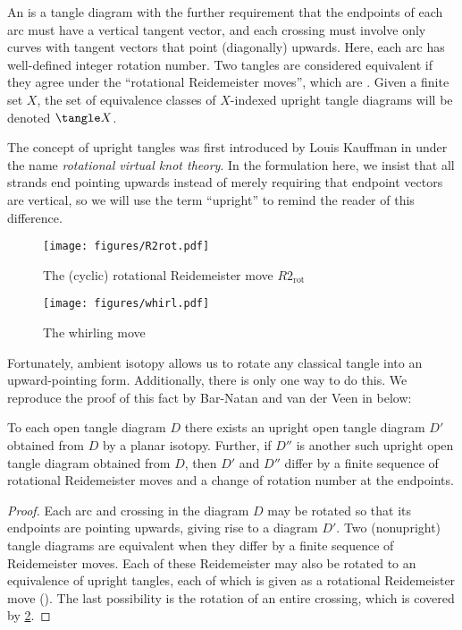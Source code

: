 \begin{definition}
        An  is a tangle diagram with the further
        requirement that the endpoints of each arc must have a vertical tangent
        vector, and each crossing must involve only curves with tangent vectors
        that point (diagonally) upwards. Here, each arc has well-defined integer
        rotation number. Two tangles are considered equivalent if they agree
        under the \enquote{rotational Reidemeister moves}, which are
        . Given a finite set $X$, the set of
        equivalence classes of $X$-indexed upright tangle diagrams will be
        denoted $\tangle X$.
\end{definition}
\begin{remark}
        The concept of upright tangles was first introduced by Louis Kauffman in
        \cite{LK} under the name \emph{rotational virtual knot theory}. In the
        formulation here, we insist that all strands end pointing upwards
        instead of merely requiring that endpoint vectors are vertical, so we
        will use the term \enquote{upright} to remind the reader of this
        difference.
\end{remark}
\begin{figure}[h]
        \centering
        \texttt{[image: figures/R2rot.pdf]}
        \caption{The (cyclic) rotational Reidemeister move $R2_{\text{rot}}$}
        \label{fig:R2rot}
\end{figure}
\begin{figure}[h]
        \centering
        \texttt{[image: figures/whirl.pdf]}
        \caption{The whirling move}
        \label{fig:whirl}
\end{figure}

Fortunately, ambient isotopy allows us to rotate any classical tangle into an
upward-pointing form. Additionally, there is only one way to do this. We
reproduce the proof of this fact by Bar-Natan and van der Veen in \cite{BV}
below:

\begin{lemma}
        To each open tangle diagram $D$ there exists an upright open tangle
        diagram $D'$ obtained from $D$ by a planar isotopy. Further, if $D''$ is
        another such upright open tangle diagram obtained from $D$, then $D'$
        and $D''$ differ by a finite sequence of rotational Reidemeister moves
        and a change of rotation number at the endpoints.
\end{lemma}
\begin{proof}
        Each arc and crossing in the diagram $D$ may be rotated so that its
        endpoints are pointing upwards, giving rise to a diagram $D'$. Two
        (nonupright) tangle diagrams are equivalent when they differ by a finite
        sequence of Reidemeister moves. Each of these Reidemeister may also be
        rotated to an equivalence of upright tangles, each of which is given as
        a rotational Reidemeister move (). The
        last possibility is the rotation of an entire crossing, which is covered
        by \cref{fig:whirl}.
\end{proof}

